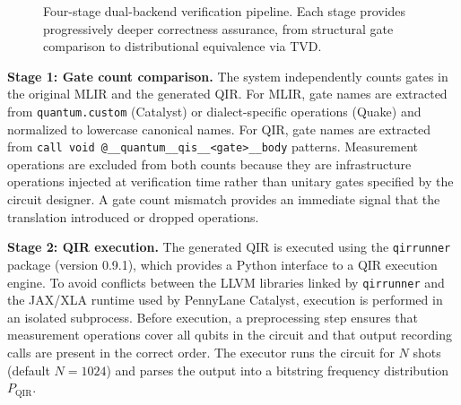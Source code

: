\documentclass[conference]{IEEEtran}
\begin{document}
\begin{figure}[htbp]
\centering
{}
\caption{Four-stage dual-backend verification pipeline. Each stage provides progressively deeper correctness assurance, from structural gate comparison to distributional equivalence via TVD.}
\label{fig:verification}
\end{figure}

\textbf{Stage 1: Gate count comparison.} The system independently counts gates in the original MLIR and the generated QIR. For MLIR, gate names are extracted from \texttt{quantum.custom} (Catalyst) or dialect-specific operations (Quake) and normalized to lowercase canonical names. For QIR, gate names are extracted from \texttt{call void @\_\_quantum\_\_qis\_\_<gate>\_\_body} patterns. Measurement operations are excluded from both counts because they are infrastructure operations injected at verification time rather than unitary gates specified by the circuit designer. A gate count mismatch provides an immediate signal that the translation introduced or dropped operations.

\textbf{Stage 2: QIR execution.} The generated QIR is executed using the \texttt{qirrunner} package (version 0.9.1), which provides a Python interface to a QIR execution engine. To avoid conflicts between the LLVM libraries linked by \texttt{qirrunner} and the JAX/XLA runtime used by PennyLane Catalyst, execution is performed in an isolated subprocess. Before execution, a preprocessing step ensures that measurement operations cover all qubits in the circuit and that output recording calls are present in the correct order. The executor runs the circuit for $N$ shots (default $N=1024$) and parses the output into a bitstring frequency distribution $P_{\text{QIR}}$.
\end{document}
